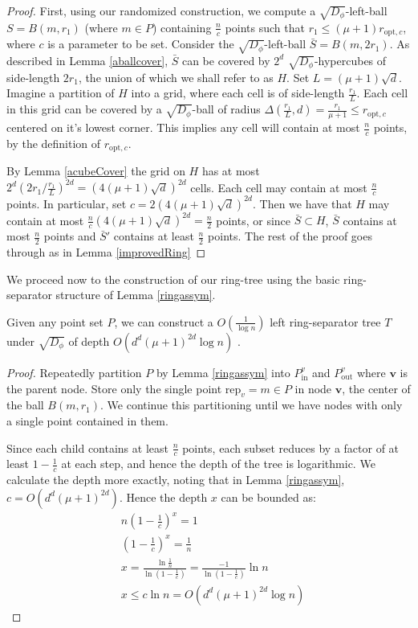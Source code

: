 \documentclass[11pt]{myclass}
\newcommand{\breg}{\ensuremath{D_\phi}}
\begin{document}
\begin{proof}
First, using our randomized construction, we compute a $\sqrt{\breg}$-left-ball $S=B(m,r_1)$ (where $m \in P$) containing $\frac{n}{c}$ 
points such that $r_1 \leq (\mu+1)r_{\text{opt},c}$, where $c$ is a parameter to be set. 
Consider the $\sqrt{\breg}$-left-ball $\bar{S} = B(m,2r_1)$.  As described in Lemma \ref{aballcover}, $\bar{S}$ can be covered by $2^d$ 
$\sqrt{\breg}$-hypercubes of side-length $2 r_1$,
 the union of which we shall refer to as $H$. Set $L = (\mu+1)\sqrt{d}$. 
 Imagine a partition of $H$ into a grid, where each cell is of side-length $\frac{r_1}{L}$. 
Each cell in this grid can be covered by a $\sqrt{\breg}$-ball of radius $\Delta(\frac{r_1}{L}, d) = \frac{r_1}{\mu+1} \leq r_{\text{opt},c}$
centered on it's lowest corner.  This implies any cell will contain at most $\frac{n}{c}$ points, 
by the definition of $r_{\text{opt},c}$. 

 By Lemma \ref{acubeCover} the grid on $H$ has at most $2^d(2r_1/\frac{r_1}{L})^{2d} = (4 (\mu+1) \sqrt{d})^{2d}$ cells.
 Each cell may contain at most $\frac{n}{c}$ points. In particular, set $c = 2(4 (\mu+1) \sqrt{d})^{2d}$. Then we have that $H$ may contain 
at most $\frac{n}{c} (4 (\mu+1) \sqrt{d})^{2d}  = \frac{n}{2}$ points,  or since $\bar{S} \subset H$, $\bar{S}$ contains at most $\frac{n}{2}$ points 
and $\bar{S}'$ contains at least $\frac{n}{2}$ points.  The rest of the proof goes through as in Lemma \ref{improvedRing}
\end{proof}


We proceed now to the construction of our ring-tree using the basic ring-separator structure of Lemma \ref{ringassym}.

\begin{lemma}\label{assymringsep}
Given any point set $P$, we can construct a $O(\frac{1}{\log n})$ 
left ring-separator tree $T$ under $\sqrt{\breg}$ of depth $O(d^d (\mu+1)^{2d} \log n)$ .
\end{lemma}

\begin{proof}
Repeatedly partition $P$ by Lemma \ref{ringassym} into $P^{v}_{\text{in}}$ and $P^{v}_{\text{out}}$ where $\textbf{v}$ is the parent node. Store only the single point $\text{rep}_v = m \in P$ in node $\textbf{v}$, the center of the ball $B(m,r_1)$. We continue this partitioning until we have nodes with only a single point contained in them.

Since each child contains at least $\frac{n}{c}$ points, each subset reduces by a factor of at least $1 - \frac{1}{c}$ at each step, 
and hence the depth of the tree is logarithmic. 
We calculate the depth more exactly, noting that in Lemma \ref{ringassym}, $c = O(d^d (\mu+1)^{2d})$.
Hence the depth $x$ can be bounded as:
\begin{align*}
& n (1 - \frac{1}{c})^x = 1 
\\ &(1- \frac{1}{c})^x = \frac{1}{n} 
\\ &x 
= \frac{ \ln \frac{1}{n}}{\ln (1 - \frac{1}{c})} 
= \frac{-1}{\ln (1 - \frac{1}{c})} \ln n
\\ & x \leq c \ln n 
 = O \left( d^d (\mu+1)^{2d} \log n \right)
\end{align*}
\end{proof}
\end{document}
